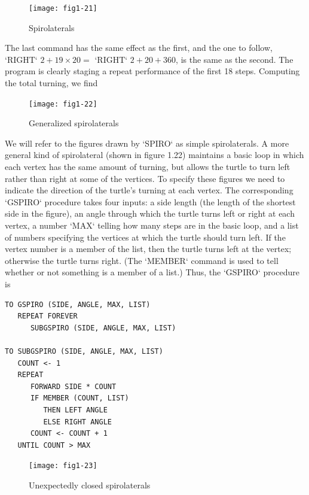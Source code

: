 \documentclass{book}
\begin{document}
\begin{figure}
\begin{center}
\texttt{[image: fig1-21]}
\caption{Spirolaterals}
\end{center}
\end{figure}

The last command has the same effect as the first, and the one to follow,
\textsc{`RIGHT`} $2 + 19 \times 20 =$ \textsc{`RIGHT`} $2 + 20 + 360$, is the same as the
second. The program is clearly staging a repeat performance of the first
18 steps. Computing the total turning, we find

\begin{figure}
\begin{center}
\texttt{[image: fig1-22]}
\caption{Generalized spirolaterals}
\end{center}
\end{figure}

We will refer to the figures drawn by \textsc{`SPIRO`} as simple spirolaterals. A
more general kind of spirolateral (shown in figure 1.22) maintains a basic
loop in which each vertex has the same amount of turning, but allows the
turtle to turn left rather than right at some of the vertices. To specify
these figures we need to indicate the direction of the turtle's turning
at each vertex. The corresponding \textsc{`GSPIRO`} procedure takes four inputs:
a side length (the length of the shortest side in the figure), an angle
through which the turtle turns left or right at each vertex, a number
\textsc{`MAX`} telling how many steps are in the basic loop, and a list of numbers
specifying the vertices at which the turtle should turn left. If the vertex
number is a member of the list, then the turtle turns left at the vertex;
otherwise the turtle turns right. (The \textsc{`MEMBER`} command is used to tell
whether or not something is a member of a list.) Thus, the \textsc{`GSPIRO`}
procedure is

\begin{verbatim}
TO GSPIRO (SIDE, ANGLE, MAX, LIST)
   REPEAT FOREVER
      SUBGSPIRO (SIDE, ANGLE, MAX, LIST)

TO SUBGSPIRO (SIDE, ANGLE, MAX, LIST)
   COUNT <- 1
   REPEAT
      FORWARD SIDE * COUNT
      IF MEMBER (COUNT, LIST)
         THEN LEFT ANGLE
         ELSE RIGHT ANGLE
      COUNT <- COUNT + 1
   UNTIL COUNT > MAX
\end{verbatim}
\begin{figure}
\begin{center}
\texttt{[image: fig1-23]}
\caption{Unexpectedly closed spirolaterals}
\end{center}
\end{figure}
\end{document}
